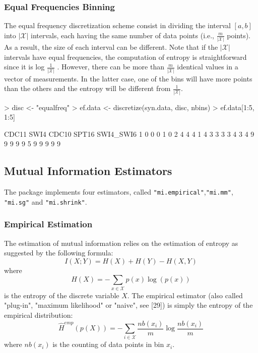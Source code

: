 \documentclass{article}
\newcommand{\Robject}[1]{{\texttt{#1}}}
\begin{document}
\subsubsection{Equal Frequencies Binning}
The equal frequency discretization scheme consist in dividing the interval $[a, b]$
into $|\mathcal{X}|$ intervals, each having the same number of data points (i.e., 
$\frac{m}{|\mathcal{X}|}$ points).
As a result, the size of each interval can be different. Note that if the $| \mathcal{X} |$
intervals have equal frequencies, the computation of entropy is straightforward since
it is log $\frac{ 1 }{ | \mathcal{X} | }$ . However, there can be more than $\frac{m}{|\mathcal{X}|}$ 
identical values in a vector of measurements. In the latter case, one of the bins will have more 
points than the others and the entropy will be different from $\frac{1}{|\mathcal{X}|}$.
\begin{Schunk}
\begin{Sinput}
> disc <- "equalfreq"
> ef.data <- discretize(syn.data, disc, nbins)
> ef.data[1:5, 1:5]
\end{Sinput}
\begin{Soutput}
  CDC11 SWI4 CDC10 SPT16 SWI4_SWI6
1     0    0     0     1         0
2     4    4     4     1         4
3     3    3     3     4         3
4     9    9     9     9         9
5     9    9     9     9         9
\end{Soutput}
\end{Schunk}

\subsection{Mutual Information Estimators}
The package implements four estimators, called \Robject{"mi.empirical"},\Robject{"mi.mm"},
\Robject{"mi.sg"} and \Robject{"mi.shrink"}. 

\subsubsection{Empirical Estimation}
The estimation of mutual information relies on the estimation of entropy as suggested by the following formula:
$$I(X;Y) = H(X) + H(Y) - H(X,Y)$$ where
$$H(X) = - \sum_{x \in \mathcal{X}} p(x) \log(p(x)) $$
is the entropy of the discrete variable $X$.
The empirical estimator (also called "plug-in", "maximum likelihood" or "naive",
see [29]) is simply the entropy of the empirical distribution:
$$\hat{H}^{emp}(p(X))=-\sum_{i\in\mathcal{X}}\frac{nb(x_{i})}{m}\log\frac{nb(x_{i})}{m}$$
where $nb(x_{i})$ is the counting of data points in bin $x_{i}$.
\end{document}
